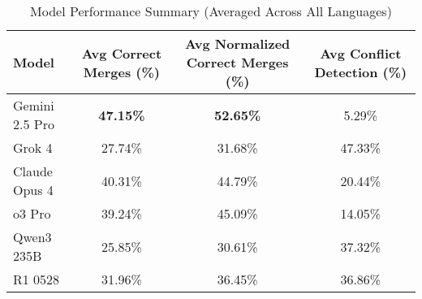 \begin{table}[htbp]
\centering
\caption{Model Performance Summary (Averaged Across All Languages)}
\label{tab:model_performance_summary}
\begin{tabular}{|l|c|c|c|}
\hline
\textbf{Model} & \textbf{Avg Correct Merges (\%)} & \textbf{Avg Normalized Correct Merges (\%)} & \textbf{Avg Conflict Detection (\%)} \\
\hline
Gemini 2.5 Pro & \textbf{47.15\%} & \textbf{52.65\%} & 5.29\% \\
Grok 4 & 27.74\% & 31.68\% & 47.33\% \\
Claude Opus 4 & 40.31\% & 44.79\% & 20.44\% \\
o3 Pro & 39.24\% & 45.09\% & 14.05\% \\
Qwen3 235B & 25.85\% & 30.61\% & 37.32\% \\
R1 0528 & 31.96\% & 36.45\% & 36.86\% \\
\hline
\end{tabular}
\end{table}

